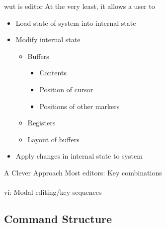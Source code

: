 \documentclass{beamer}
\begin{document}
            \begin{frame}{wut is editor}
                \pause
                At the very least, it allows a user to
                \begin{itemize}
                    \pause
                    \item Load state of system into internal state
                    \pause
                    \item Modify internal state
                    \begin{itemize}
                        \pause
                        \item Buffers
                        \pause
                        \begin{itemize}
                            \item Contents
                            \item Position of cursor
                            \item Positions of other markers
                        \end{itemize}
                        \pause
                        \item Registers
                        \pause
                        \item Layout of buffers
                    \end{itemize}
                    \pause
                    \item Apply changes in internal state to system
                \end{itemize}
            \end{frame}

            \begin{frame}{A Clever Approach}
                Most editors: Key combinations \\~\\
                \pause
                vi: Modal editing/key sequences
            \end{frame}

        \subsection{Command Structure}
\end{document}
